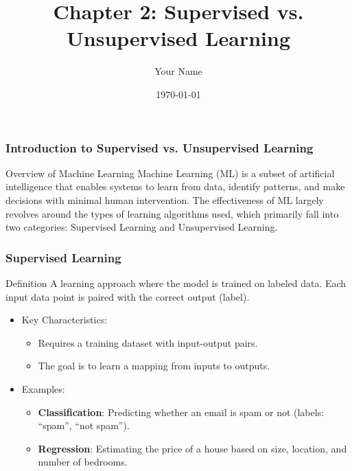 \documentclass{beamer}
\title{Chapter 2: Supervised vs. Unsupervised Learning}
\author{Your Name}
\institute{Your Institution}
\date{\today}
\begin{document}
\frame{\titlepage}

\begin{frame}[fragile]
    \frametitle{Introduction to Supervised vs. Unsupervised Learning}
    \begin{block}{Overview of Machine Learning}
        Machine Learning (ML) is a subset of artificial intelligence that enables systems to learn from data, identify patterns, and make decisions with minimal human intervention. The effectiveness of ML largely revolves around the types of learning algorithms used, which primarily fall into two categories: Supervised Learning and Unsupervised Learning.
    \end{block}
\end{frame}

\begin{frame}[fragile]
    \frametitle{Supervised Learning}
    \begin{block}{Definition}
        A learning approach where the model is trained on labeled data. Each input data point is paired with the correct output (label).
    \end{block}
    
    \begin{itemize}
        \item Key Characteristics:
        \begin{itemize}
            \item Requires a training dataset with input-output pairs.
            \item The goal is to learn a mapping from inputs to outputs.
        \end{itemize}

        \item Examples:
        \begin{itemize}
            \item \textbf{Classification}: Predicting whether an email is spam or not (labels: ``spam'', ``not spam'').
            \item \textbf{Regression}: Estimating the price of a house based on size, location, and number of bedrooms.
        \end{itemize}
    \end{itemize}
\end{frame}
\end{document}
